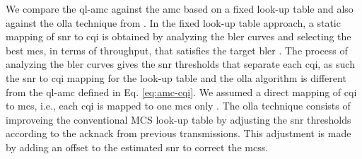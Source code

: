 %
We compare the \gls{ql-amc} against the \gls{amc} based on a fixed look-up table \cite{fantacci2009adaptive} and also against the \gls{olla} technique from \cite{Pedersen2007}.
%
In the fixed look-up table approach, a static mapping of \gls{snr} to \gls{cqi} is obtained by analyzing the \gls{bler} curves and selecting the best \gls{mcs}, in terms of throughput, that satisfies the target \gls{bler} \cite{bruno2014robust}.
%
The process of analyzing the \gls{bler} curves gives the \gls{snr} thresholds that separate each \gls{cqi}, as such the \gls{snr} to \gls{cqi} mapping for the look-up table and the \gls{olla} algorithm is different from the \gls{ql-amc} defined in Eq. \eqref{eq:amc-cqi}.
%
We assumed a direct mapping of \gls{cqi} to \gls{mcs}, i.e., each \gls{cqi} is mapped to one \gls{mcs} only .
The \gls{olla} technique consists of improveing the conventional MCS look-up table by adjusting the \gls{snr} thresholds according to the \gls{acknack} from previous transmissions.
%
This adjustment is made by adding an offset to the estimated \gls{snr} to correct the \gls{mcs}s.
